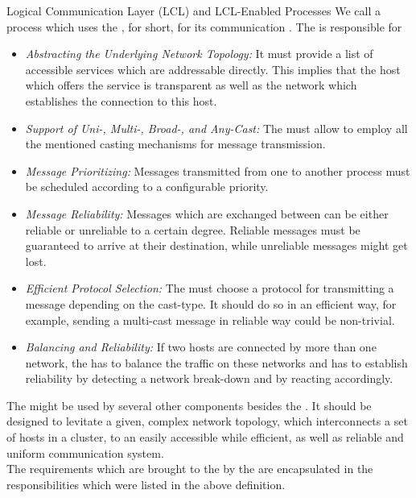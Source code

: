 \documentclass[a4paper, 12pt]{book}
\begin{document}
\begin{definition*}{Logical Communication Layer (LCL) and LCL-Enabled Processes}
  \label{def:LCL}
  We call a process which uses the ,  for
  short, for its communication . The  is
  responsible for
  \begin{itemize}
  \item \emph{Abstracting the Underlying Network Topology:} It must provide a
    list of accessible services which are addressable directly. This implies
    that the host which offers the service is transparent as well as the
    network which establishes the connection to this host.
  \item \emph{Support of Uni-, Multi-, Broad-, and Any-Cast:} The  must
    allow to employ all the mentioned casting mechanisms for message
    transmission. 
  \item \emph{Message Prioritizing:} Messages transmitted from one  to another  process must be scheduled according
    to a configurable priority.
  \item \emph{Message Reliability:} Messages which are exchanged between 
     can be either reliable or unreliable to a
    certain degree. Reliable messages must be guaranteed to arrive at their
    destination, while unreliable messages might get lost. 
  \item \emph{Efficient Protocol Selection:} The  must choose a
    protocol for transmitting a message depending on the cast-type. It should
    do so in an efficient way, for example, sending a multi-cast message in
    reliable way could be non-trivial. 
  \item \emph{Balancing and Reliability:} If two hosts are
    connected by more than one network, the  has to balance the
    traffic on these networks and has to establish reliability by detecting a
    network break-down and by reacting accordingly. 
  \end{itemize}
\end{definition*}

The  might be used by several other components besides the
\SYNEIGHT. It should be designed to levitate a given, complex
network topology, which interconnects a set of hosts in a cluster, to
an easily accessible while efficient, as well as reliable and uniform
communication system.\\
%
The requirements which are brought to the  by the \SYNEIGHT are
encapsulated in the responsibilities which were listed in the above
definition.
\end{document}
